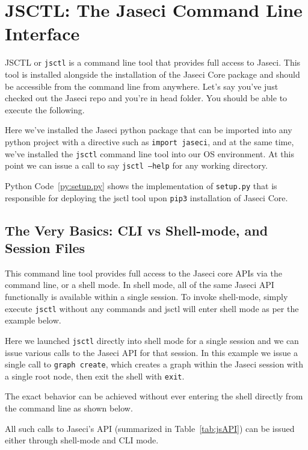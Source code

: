 \section{JSCTL: The Jaseci Command Line Interface}
JSCTL or \texttt{jsctl} is a command line tool that provides full access to Jaseci. This tool is installed alongside the installation of the Jaseci Core package and should be accessible from the command line from anywhere. Let's say you've just checked out the Jaseci repo and you're in head folder. You should be able to execute the following.
\par
{}
\par
Here we've installed the Jaseci python package that can be imported into any python project with a directive such as \texttt{import jaseci}, and at the same time, we've installed the \texttt{jsctl} command line tool into our OS environment. At this point we can issue a call to say \texttt{jsctl --help} for any working directory.
\begin{nerd}
    Python Code~\ref{py:setup.py} shows the implementation of \texttt{setup.py} that is responsible for deploying the jsctl tool upon \texttt{pip3} installation of Jaseci Core.
\end{nerd}

\subsection{The Very Basics: CLI vs Shell-mode, and Session Files }
This command line tool provides full access to the Jaseci core APIs via the command line, or a shell mode. In shell mode, all of the same Jaseci API functionally is available within a single session. To invoke shell-mode, simply execute \texttt{jsctl} without any commands and jsctl will enter shell mode as per the example below.
\par
{}
\par
Here we launched \texttt{jsctl} directly into shell mode for a single session and we can issue various calls to the Jaseci API for that session. In this example we issue a single call to \texttt{graph create}, which creates a graph within the Jaseci session with a single root node, then exit the shell with \texttt{exit}.
\par
The exact behavior can be achieved without ever entering the shell directly from the command line as shown below.
\par
{}
\par
All such calls to Jaseci's API (summarized in Table~\ref{tab:jsAPI}) can be issued either through shell-mode and CLI mode.
